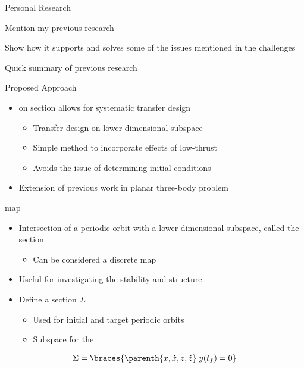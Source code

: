 
\begin{frame}{Personal Research}

Mention my previous research

Show how it supports and solves some of the issues mentioned in the challenges

Quick summary of previous research
\end{frame}

\begin{frame}{Proposed Approach} %
  \begin{itemize}
      \item {} on \Poincare section allows for systematic transfer design
        \begin{itemize}
            \item Transfer design on lower dimensional subspace
            \item Simple method to incorporate effects of low-thrust 
            \item Avoids the issue of determining initial conditions
        \end{itemize}
        \pause
      \item Extension of previous work in planar three-body problem     
  \end{itemize}

\end{frame} %

\begin{frame}{\Poincare map}
\begin{itemize}
    \item Intersection of a periodic orbit with a lower dimensional subspace, called the \Poincare section
    \pause
        \begin{itemize}
            \item Can be considered a discrete map 
        \end{itemize}
        \pause
    \item Useful for investigating the stability and structure 
    \pause
    \item Define a \Poincare section \( \Sigma \) 
        \begin{itemize}
            \item Used for initial and target periodic orbits
            \item Subspace for the 
        \end{itemize}
\end{itemize}

\begin{align*}
    \Sigma = \braces{\parenth{x, \dot{x}, z, \dot{z}} | y(t_f) = 0 }
\end{align*}

\end{frame}

